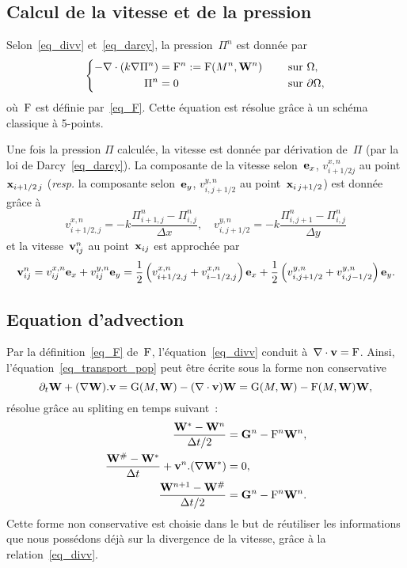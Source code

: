 \documentclass[main.tex]{subfiles}
\begin{document}
\subsection{Calcul de la vitesse et de la pression} 


Selon~\eqref{eq_divv} et~\eqref{eq_darcy}, 
la pression~$\Pi^n$ est donnée par
\begin{equation}\label{eq_pression_disc}
\left\{
\begin{aligned}
-\nabla\cdot (k\nabla \Pi^n)&={\rm F}^n:={\rm F}(M^n,{\bf W}^n) & \quad \textrm{ sur } & \Omega , \\
\Pi^n &=0 & \quad \textrm{ sur } & \partial \Omega ,
\end{aligned}
\right.
\end{equation}
où~${\rm F}$ est définie par~\eqref{eq_F}. 
Cette équation est résolue grâce à un schéma classique à 5-points. 


Une fois la pression $\Pi$ calculée, la vitesse est donnée par dérivation de~$\Pi$ (par la loi de Darcy~\eqref{eq_darcy}).
La composante de la vitesse selon~${\bf e}_x$, $v^{x,n}_{i+1/2 j}$ au point 
$\mathbf{x}_{i+1/2\,j}$ ({\it resp.} la composante selon~${\bf e}_y$, $v^{y,n}_{i,
  j+1/2}$ au point~${\mathbf{x}_{i\,j+1/2}}$) est donnée grâce à
\begin{equation*}
v^{x,n}_{i+1/2,j} = -k \frac{\Pi^n_{i+1,j}-\Pi^n_{i,j}}{\Delta x},\quad
v^{y,n}_{i,j+1/2} = -k \frac{\Pi^n_{i,j+1}-\Pi^n_{i,j}}{\Delta y}
\end{equation*}
et la vitesse~$\mathbf{v}^n_{ij}$ au point~$\mathbf{x}_{ij}$ est approchée par
\begin{align}
  \label{eq_vit_discr}
  \mathbf{v}^n_{ij}=    v^{x,n}_{ij}{\bf e}_x
  +v^{y,n}_{ij}{\bf e}_y=\frac{1}{2}\left(v^{x,n}_{i+1/2,j}
    +v^{x,n}_{i-1/2,j} \right) {\bf e}_x+\frac{1}{2}\left(v^{y,n}_{i,j+1/2}
    +v^{y,n}_{i,j-1/2} \right) {\bf e}_y.
\end{align}

\subsection{Equation d'advection}
Par la définition~\eqref{eq_F} de~${\rm F}$, l'équation~\eqref{eq_divv} 
conduit à~$\nabla\cdot\mathbf{v}={\rm F}$. 
Ainsi, l'équation~\eqref{eq_transport_pop} peut être écrite sous la forme non conservative
\begin{equation}\label{eq_non_conservative}
\partial_t {\bf W} + (\nabla {\bf W}).\mathbf{v} = {\rm G}(M,{\bf W})-(\nabla\cdot \mathbf{v}){\bf W} = {\rm G}(M,{\bf W})-{\rm F}(M,{\bf W}){\bf W},
\end{equation}
résolue grâce au spliting en temps suivant~:
\begin{align}
 \dfrac{\W^*-\W^n}{\Delta t / 2}  &= \GG^n-\Frm^n\W^n, %
 \label{eq_snd_membre} \\
\dfrac{\W^\#-\W^*}{\Delta t} + \vit^n.(\nabla \W^*)&= 0,%
 \label{eq_transp_weno}\\
 \dfrac{\W^{n+1}-\W^\#}{\Delta t / 2}  &= \GG^n-\Frm^n\W^n. \label{eq_snd_membre2} 
\end{align}
Cette forme non conservative est choisie dans le but de réutiliser les informations que nous possédons déjà sur la divergence de la vitesse, grâce à la relation~\eqref{eq_divv}.
\end{document}
